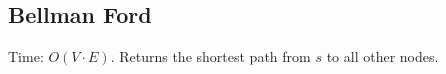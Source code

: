 \subsection{Bellman Ford}

Time: $O(V \cdot E)$.
Returns the shortest path from $s$ to all other nodes.
